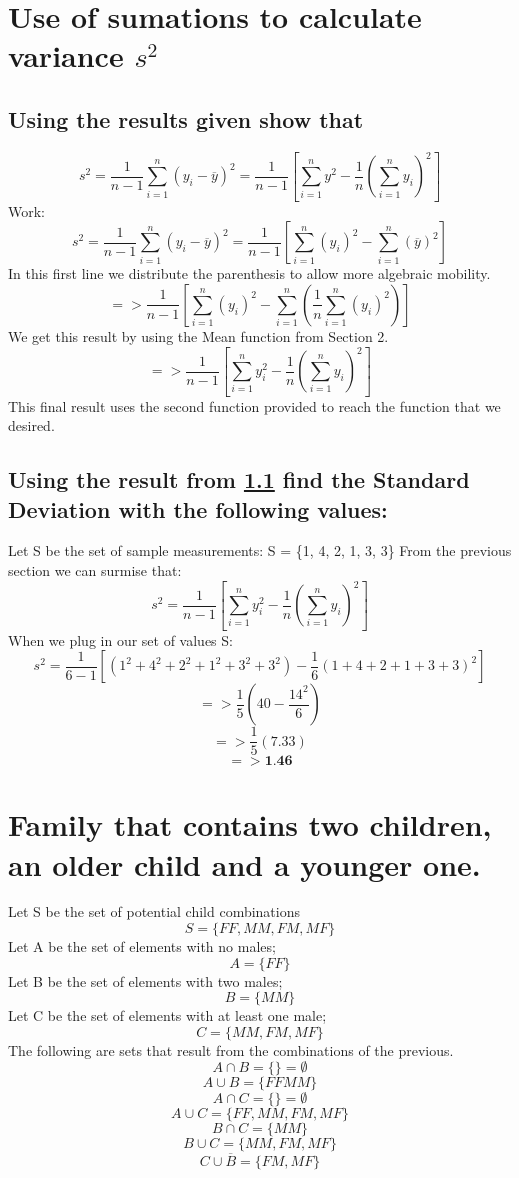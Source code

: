 \documentclass[a4paper,12px] {article}
\begin{document}
\section{Use of sumations to calculate variance $s^2$}
\subsection{Using the results given show that}
\label{sec7.1}
$$s^2 = \frac{1}{n-1}\sum_{i=1}^n(y_i-\overline y)^2 = \frac{1}{n-1}[\sum_{i=1}^n y^2 - \frac{1}{n}(\sum_{i=1}^n y_i)^2]$$
Work:\newline
$$ s^2 =  \frac{1}{n-1}\sum_{i=1}^n(y_i-\overline y)^2 = \frac{1}{n-1}[\sum_{i=1}^n (y_i)^2 - \sum_{i=1}^n (\overline y)^2]$$ In this first line we distribute the parenthesis to allow more algebraic mobility.
$$ => \frac{1}{n-1}[\sum_{i=1}^n (y_i)^2 - \sum_{i=1}^n (\frac{1}{n} \sum_{i=1}^n (y_i)^2)]$$ We get this result by using the Mean function from Section 2.
$$ => \frac{1}{n-1} [\sum_{i=1}^n y_i ^2 - \frac{1}{n} ( \sum_{i=1}^n y_i)^2]$$ This final result uses the second function provided to reach the function that we desired.
\subsection{Using the result from \ref{sec7.1} find the Standard Deviation with the following values:}
Let S be the set of sample measurements: S = \{1, 4, 2, 1, 3, 3\}\newline
From the previous section we can surmise that:
$$s^2 = \frac{1}{n-1} [\sum_{i=1}^n y_i ^2 - \frac{1}{n} ( \sum_{i=1}^n y_i)^2]$$
When we plug in our set of values S:
$$s^2 = \frac{1}{6-1}[(1^2 + 4^2 + 2^2 + 1^2 + 3^2 + 3^2) - \frac{1}{6} (1 + 4 + 2 + 1 + 3 + 3) ^ 2]$$
$$ => \frac{1}{5} (40 - \frac{14^2}{6})$$
$$ => \frac{1}{5} (7.33)$$
$$ => \textbf{1.46}$$

\section{Family that contains two children, an older child and a younger one.}
Let S be the set of potential child combinations
$$S = \{FF, MM, FM, MF\}$$ \newline
Let A be the set of elements with no males; $$ A = \{FF\}$$
Let B be the set of elements with two males; $$ B = \{MM\}$$
Let C be the set of elements with at least one male; $$ C = \{MM, FM, MF\}$$\newline
The following are sets that result from the combinations of the previous.
$$ A \cap B = \{ \} = \emptyset$$
$$ A \cup B = \{ FF MM \}$$
$$ A \cap C= \{ \} = \emptyset$$
$$ A \cup C = \{ FF, MM, FM, MF \}$$
$$ B \cap C = \{ MM \}$$
$$ B \cup C = \{ MM, FM, MF \}$$
$$ C \cup \overline B = \{ FM, MF \}$$
\end{document}
